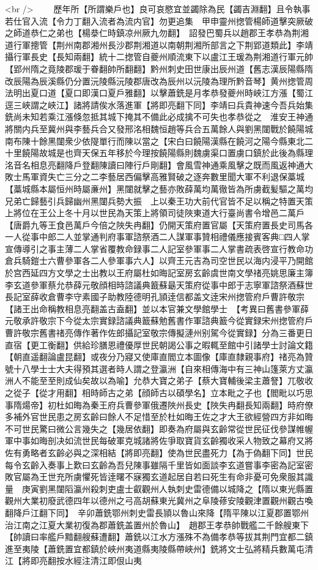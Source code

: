 <br />
　　歷年所【所謂樂戶也】良可哀愍宜並蠲除為民【蠲吉淵翻】且令執事若仕官入流【令力丁翻入流者為流内官】勿更追集　甲申靈州揔管楊師道擊突厥破之師道恭仁之弟也【楊㳟仁時鎮凉州厥九勿翻】　詔發巴蜀兵以趙郡王孝恭為荆湘道行軍摠管【荆州南郡湘州長沙郡荆湘道以南朝荆湘所部言之下荆郢道類此】李靖攝行軍長史【長知兩翻】統十二揔管自夔州順流東下以盧江王瑗為荆湘道行軍元帥【郢州隋之竟陵郡瑗于眷翻帥所翻翻】黔州刺史田世康出辰州道【舊志漢辰陽縣隋改辰陽為辰溪縣仍分置沅陵縣沅陵郡唐改為辰州以沅陵為理所黔音琴】黄州揔管周法明出夏口道【夏口即漢口夏戶雅翻】以擊蕭銑是月孝恭發夔州時峽江方漲【蜀江逕三峽謂之峽江】諸將請俟水落進軍【將即亮翻下同】李靖曰兵貴神速今吾兵始集銑尚未知若乘江漲倏忽抵其城下掩其不備此必成擒不可失也孝恭從之　淮安王神通將關内兵至冀州與李藝兵合又發邢洺相魏恒趙等兵合五萬餘人與劉黑闥戰於饒陽城南布陳十餘黑闥衆少依隄單行而陳以當之【宋白曰饒陽漢縣在饒河之陽今縣東北二十里饒陽故城是也齊天保五年移於今理按饒陽縣則魏虜渠口置虜口鎮於此後為縣理洺音名相息亮翻降戶登翻陳讀曰陣行戶剛翻】會風雪神通乘風擊之既而風返神通大敗士馬軍資失亡三分之二李藝居西偏擊高雅賢破之逐奔數里聞大軍不利退保藁城【藁城縣本屬恒州時屬亷州】黑闥就擊之藝亦敗薛萬均萬徹皆為所虜截髪驅之萬均兄弟亡歸藝引兵歸幽州黑闥兵勢大振　上以秦王功大前代官皆不足以稱之特置天策上將位在王公上冬十月以世民為天策上將領司徒陜東道大行臺尚書令增邑二萬戶【唐爵九等王食邑萬戶今倍之陜失冉翻】仍開天策府置官屬【天策府置長史司馬各一人從事中郎二人並掌通判府事軍諮祭酒二人謀軍事贊相禮儀應接賓客典□四人掌宣傳導引之事主薄二人掌省覆教命録事二人記室參軍事二人掌書疏表啓宣行教命功倉兵騎鎧士六曹參軍各二人參軍事六人】以齊王元吉為司空世民以海内浸平乃開館於宫西延四方文學之士出教以王府屬杜如晦記室房玄齡虞世南文學禇亮姚思廉主簿李玄道參軍蔡允恭薛元敬顔相時諮議典籖蘇朂天策府從事中郎于志寧軍諮祭酒蘇世長記室薛收倉曹李守素國子助教陸德明孔頴逹信都盖文逹宋州揔管府戶曹許敬宗【諸王出命稱教相息亮翻盖古盍翻】並以本官兼文學館學士　【考異曰舊書參軍薛元敬承許敬宗下今從太宗實録諮議典籖蘇勉舊書作軍諮典籖今從實録宋州揔管府戶曹許敬宗舊書禇亮傳作著作佐郎攝記室敬宗傳擬漣州别駕今從實録】分為三番更日直宿【更工衡翻】供給珍膳恩禮優厚世民朝謁公事之暇輒至館中引諸學士討論文籍【朝直遥翻論盧昆翻】或夜分乃寢又使庫直閻立本圖像【庫直隸親事府】禇亮為贊號十八學士士大夫得預其選者時人謂之登瀛洲【自來相傳海中有三神山篷萊方丈瀛洲人不能至至則成仙矣故以為喻】允恭大寶之弟子【蔡大寶輔後梁主蕭詧】兀敬收之從子【從才用翻】相時師古之弟【顔師古以碩學名】立本毗之子也【閻毗以巧思事隋煬帝】初杜如晦為秦王府兵曹參軍俄遷陜州長史【陜失冉翻長知兩翻】時府僚多補外官世民患之房玄齡曰餘人不足惜至於杜如晦王佐之才大王欲經營四方非如晦不可世民驚曰微公言幾失之【幾居依翻】即奏為府屬與玄齡常從世民征伐參謀帷幄軍中事如晦剖决如流世民每破軍克城諸將佐爭取寶貨玄齡獨收采人物致之幕府又將佐有勇略者玄齡必與之深相結【將即亮翻】使為世民盡死力【為于偽翻下同】世民每令玄齡入奏事上歎曰玄齡為吾兒陳事雖隔千里皆如面談李玄道嘗事李密為記室密敗官屬為王世充所虜懼死皆逹曙不寐獨玄道起居自若曰死生有命非憂可免衆服其識量　庚寅劉黑闥䧟瀛州殺刺吏盧士叡觀州人執刺史雷德備以城降之【隋以東光縣置觀州大業初廢武德四年以德州之弓高胡蘇東光冀州之阜陵蓚安陵觀津置觀州觀古喚翻降戶江翻下同】　辛卯蕭銑鄂州刺史雷長頴以魯山來降【隋平陳以江夏郡置鄂州治江南之江夏大業初復為郡蕭銑盖置州於魯山】　趙郡王孝恭帥戰艦二千餘艘東下【帥讀曰率艦戶黯翻艘蘇遭翻】蕭銑以江水方漲殊不為備孝恭等拔其荆門宜都二鎮進至夷陵【蕭銑置宜都鎮於峽州夷道縣夷陵縣帶峽州】銑將文士弘將精兵數萬屯清江【將即亮翻按水經注清江即佷山夷
